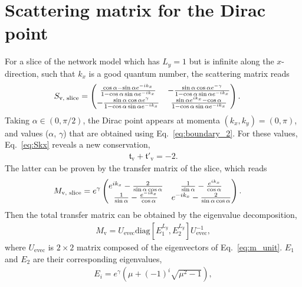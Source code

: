 \documentclass[aps,pra,reprint,superscriptaddress,showkeys,amsmath,amssymb,longbibliography]{revtex4-1}
\begin{document}
\section{Scattering matrix for the Dirac point}
\label{app: sca_dirac}

For a slice of the network model which has $L_y=1$ but is infinite along the $x$-direction, such that $k_x$ is a good quantum number, the scattering matrix reads
\begin{eqnarray}\label{eq:Skx}
\hspace{-5mm}S_{\text{v, slice}}=\begin{pmatrix}
\frac{\cos\alpha-\sin\alpha e^{-ik_x}}{1-\cos\alpha\sin\alpha e^{-ik_x}} & -\frac{\sin\alpha\cos\alpha e^{-\gamma}}{1-\cos\alpha\sin\alpha e^{-ik_x}}\\
-\frac{\sin\alpha\cos\alpha e^{\gamma}}{1-\cos\alpha\sin\alpha e^{-ik_x}} &\frac{\sin\alpha e^{ik_x}-\cos\alpha}{1-\cos\alpha\sin\alpha e^{-ik_x}}
\end{pmatrix}.
\end{eqnarray}
Taking $\alpha\in (0,\pi/2)$, the Dirac point appears at momenta $(k_x,k_y)=(0,\pi)$, and values ($\alpha$, $\gamma$) that are obtained using Eq.~\eqref{eq:boundary_2}. For these values, Eq.~\eqref{eq:Skx} reveals a new conservation,
\begin{eqnarray}
\mathfrak{t}_{\text{v}}+\mathfrak{t}'_{\text{v}}=-2.
\end{eqnarray}
The latter can be proven by the transfer matrix of the slice, which reads
\begin{eqnarray}
\hspace{-5mm}M_{\text{v, slice}}=e^{\gamma}\begin{pmatrix}
e^{ik_x}-\frac{2}{\sin\alpha\cos\alpha}&\frac{1}{\sin\alpha}-\frac{e^{ik_x}}{\cos\alpha}\\
\frac{1}{\sin\alpha}-\frac{e^{-ik_x}}{\cos\alpha}&e^{-ik_x}-\frac{2}{\sin\alpha\cos\alpha}
\end{pmatrix}.\label{eq:m_unit}
\end{eqnarray}
Then the total transfer matrix can be obtained by the eigenvalue decomposition,
\begin{eqnarray}
M_{\text{v}}=U_{\text{evec}}\text{diag}[E_1^{L_y},E_2^{L_y}]U_{\text{evec}}^{-1},\label{eq:m_total}
\end{eqnarray}
where $U_{\text{evec}}$ is $2\times 2$ matrix composed of the eigenvectors of Eq.\ \eqref{eq:m_unit}. $E_1$ and $E_2$ are their corresponding eigenvalues,
\begin{eqnarray}
E_i=e^{\gamma}(\mu+(-1)^{i}\sqrt{\mu^2-1}),
\end{eqnarray}
\end{document}
